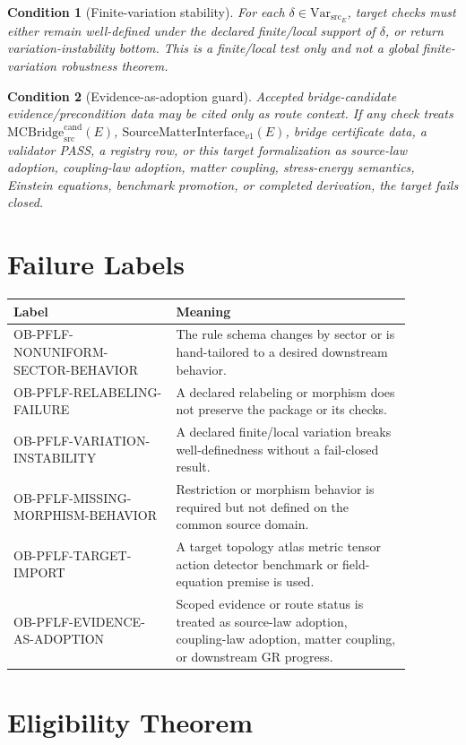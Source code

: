 \documentclass[11pt]{article}
\newcommand{\MCBridgeCand}{\mathrm{MCBridge}_{\mathrm{src}}^{\mathrm{cand}}}
\newcommand{\SMI}{\mathrm{SourceMatterInterface}_{v1}}
\newcommand{\VarSrc}{\mathrm{Var}_{\mathrm{src}}}
\newtheorem{condition}{Condition}
\begin{document}
\begin{condition}[Finite-variation stability]
For each \(\delta\in\VarSrc_E\), target checks must either remain well-defined
under the declared finite/local support of \(\delta\), or return
variation-instability bottom. This is a finite/local test only and not a
global finite-variation robustness theorem.
\end{condition}

\begin{condition}[Evidence-as-adoption guard]
Accepted bridge-candidate evidence/precondition data may be cited only as
route context. If any check treats \(\MCBridgeCand(E)\), \(\SMI(E)\), bridge
certificate data, a validator PASS, a registry row, or this target
formalization as source-law adoption, coupling-law adoption, matter coupling,
stress-energy semantics, Einstein equations, benchmark promotion, or completed
derivation, the target fails closed.
\end{condition}

\section{Failure Labels}

\begin{longtable}{p{0.36\linewidth}p{0.52\linewidth}}
\toprule
Label & Meaning \\
\midrule
OB-PFLF-NONUNIFORM-SECTOR-BEHAVIOR & The rule schema changes by sector or is hand-tailored to a desired downstream behavior. \\
OB-PFLF-RELABELING-FAILURE & A declared relabeling or morphism does not preserve the package or its checks. \\
OB-PFLF-VARIATION-INSTABILITY & A declared finite/local variation breaks well-definedness without a fail-closed result. \\
OB-PFLF-MISSING-MORPHISM-BEHAVIOR & Restriction or morphism behavior is required but not defined on the common source domain. \\
OB-PFLF-TARGET-IMPORT & A target topology atlas metric tensor action detector benchmark or field-equation premise is used. \\
OB-PFLF-EVIDENCE-AS-ADOPTION & Scoped evidence or route status is treated as source-law adoption, coupling-law adoption, matter coupling, or downstream GR progress. \\
\bottomrule
\end{longtable}

\section{Eligibility Theorem}
\end{document}

